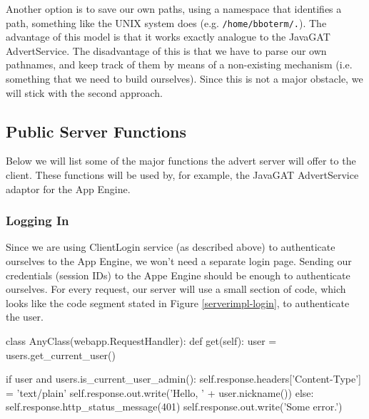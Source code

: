 Another option is to save our own paths, using a namespace that identifies a
path, something like the UNIX system does (e.g. \texttt{/home/bboterm/.}). The
advantage of this model is that it works exactly analogue to the JavaGAT
AdvertService. The disadvantage of this is that we have to parse our own
pathnames, and keep track of them by means of a non-existing mechanism (i.e.
something that we need to build ourselves). Since this is not a major obstacle,
we will stick with the second approach. 

\subsection{Public Server Functions}
Below we will list some of the major functions the advert server will offer to
the client. These functions will be used by, for example, the JavaGAT
AdvertService adaptor for the App Engine.

\subsubsection{Logging In}
Since we are using ClientLogin service (as described above) to authenticate
ourselves to the App Engine, we won't need a separate login page. Sending our
credentials (session IDs) to the Appe Engine should be enough to authenticate
ourselves. For every request, our server will use a small section of code, which
looks like the code segment stated in Figure \ref{serverimpl-login}, to
authenticate the user.

\begin{figure*}[ht] %
\begin{center}
\begin{code}
class AnyClass(webapp.RequestHandler):
  def get(self):
    user = users.get_current_user()

    if user and users.is_current_user_admin():
      self.response.headers['Content-Type'] = 'text/plain'
      self.response.out.write('Hello, ' + user.nickname())
    else:
      self.response.http_status_message(401)
      self.response.out.write('Some error.')
\end{code}
\caption{A MetaData Object.\label{serverimpl-login}}
\end{center}
\end{figure*}
      
